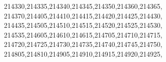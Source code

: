 \documentclass[
  12,
  dvipsnames]{article}
\newenvironment{Shaded}{\begin{snugshade}}{\end{snugshade}}
\newcommand{\NormalTok}[1]{#1}
\newcommand{\StringTok}[1]{\textcolor[rgb]{0.31,0.60,0.02}{#1}}
\begin{document}
\begin{Shaded}
\begin{Highlighting}[]
                  \StringTok{\textquotesingle{}214330\textquotesingle{}}\NormalTok{,}\StringTok{\textquotesingle{}214335\textquotesingle{}}\NormalTok{,}\StringTok{\textquotesingle{}214340\textquotesingle{}}\NormalTok{,}\StringTok{\textquotesingle{}214345\textquotesingle{}}\NormalTok{,}\StringTok{\textquotesingle{}214350\textquotesingle{}}\NormalTok{,}\StringTok{\textquotesingle{}214360\textquotesingle{}}\NormalTok{,}\StringTok{\textquotesingle{}214365\textquotesingle{}}\NormalTok{,}
                  \StringTok{\textquotesingle{}214370\textquotesingle{}}\NormalTok{,}\StringTok{\textquotesingle{}214405\textquotesingle{}}\NormalTok{,}\StringTok{\textquotesingle{}214410\textquotesingle{}}\NormalTok{,}\StringTok{\textquotesingle{}214415\textquotesingle{}}\NormalTok{,}\StringTok{\textquotesingle{}214420\textquotesingle{}}\NormalTok{,}\StringTok{\textquotesingle{}214425\textquotesingle{}}\NormalTok{,}\StringTok{\textquotesingle{}214430\textquotesingle{}}\NormalTok{,}
                  \StringTok{\textquotesingle{}214435\textquotesingle{}}\NormalTok{,}\StringTok{\textquotesingle{}214505\textquotesingle{}}\NormalTok{,}\StringTok{\textquotesingle{}214510\textquotesingle{}}\NormalTok{,}\StringTok{\textquotesingle{}214515\textquotesingle{}}\NormalTok{,}\StringTok{\textquotesingle{}214520\textquotesingle{}}\NormalTok{,}\StringTok{\textquotesingle{}214525\textquotesingle{}}\NormalTok{,}\StringTok{\textquotesingle{}214530\textquotesingle{}}\NormalTok{,}
                  \StringTok{\textquotesingle{}214535\textquotesingle{}}\NormalTok{,}\StringTok{\textquotesingle{}214605\textquotesingle{}}\NormalTok{,}\StringTok{\textquotesingle{}214610\textquotesingle{}}\NormalTok{,}\StringTok{\textquotesingle{}214615\textquotesingle{}}\NormalTok{,}\StringTok{\textquotesingle{}214705\textquotesingle{}}\NormalTok{,}\StringTok{\textquotesingle{}214710\textquotesingle{}}\NormalTok{,}\StringTok{\textquotesingle{}214715\textquotesingle{}}\NormalTok{,}
                  \StringTok{\textquotesingle{}214720\textquotesingle{}}\NormalTok{,}\StringTok{\textquotesingle{}214725\textquotesingle{}}\NormalTok{,}\StringTok{\textquotesingle{}214730\textquotesingle{}}\NormalTok{,}\StringTok{\textquotesingle{}214735\textquotesingle{}}\NormalTok{,}\StringTok{\textquotesingle{}214740\textquotesingle{}}\NormalTok{,}\StringTok{\textquotesingle{}214745\textquotesingle{}}\NormalTok{,}\StringTok{\textquotesingle{}214750\textquotesingle{}}\NormalTok{,}
                  \StringTok{\textquotesingle{}214805\textquotesingle{}}\NormalTok{,}\StringTok{\textquotesingle{}214810\textquotesingle{}}\NormalTok{,}\StringTok{\textquotesingle{}214905\textquotesingle{}}\NormalTok{,}\StringTok{\textquotesingle{}214910\textquotesingle{}}\NormalTok{,}\StringTok{\textquotesingle{}214915\textquotesingle{}}\NormalTok{,}\StringTok{\textquotesingle{}214920\textquotesingle{}}\NormalTok{,}\StringTok{\textquotesingle{}214925\textquotesingle{}}\NormalTok{,}

\end{Highlighting}
\end{Shaded}
\end{document}

